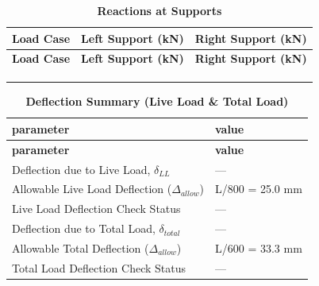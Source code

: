 \documentclass[12pt,a4paper]{report}
\numberwithin{table}{chapter}
\numberwithin{figure}{chapter}
\begin{document}
\vspace{1em}
\begin{longtable}{|>{\centering\arraybackslash}p{5.2cm}|>{\centering\arraybackslash}p{5.2cm}|>{\centering\arraybackslash}p{5.2cm}|}
\caption{\textbf{Reactions at Supports}}
\hline
\textbf{Load Case} & \textbf{Left Support (kN)} & \textbf{Right Support (kN)} \\[6pt]
\hline
\endfirsthead

\hline
\textbf{Load Case} & \textbf{Left Support (kN)} & \textbf{Right Support (kN)} \\[6pt]
\hline
\endhead
 &  &  \\[6pt]
\hline
 &  &  \\[6pt]
\hline
 &  &  \\[6pt]
\hline
\end{longtable}

\vspace{1em}
\begin{longtable}{|L{7cm}|p{8.5cm}|}
\caption{\textbf{Deflection Summary (Live Load \& Total Load)}}
\hline
\textbf{parameter} & \textbf{value} \\
\hline
\endfirsthead

\hline
\textbf{parameter} & \textbf{value} \\
\hline
\endhead
\textnormal{Deflection due to Live Load, $\delta_{LL}$} & --- \\[6pt]
\hline
\textnormal{Allowable Live Load Deflection ($\Delta_{allow}$)} & L/800 = 25.0 mm \\[6pt]
\hline
\textnormal{Live Load Deflection Check Status} & --- \\[6pt]
\hline
\textnormal{Deflection due to Total Load, $\delta_{total}$} & --- \\[6pt]
\hline
\textnormal{Allowable Total Deflection ($\Delta_{allow}$)} & L/600 = 33.3 mm \\[6pt]
\hline
\textnormal{Total Load Deflection Check Status} & --- \\[6pt]
\hline
\end{longtable}

\vspace{1em}
\noindent
\noindent{}
\noindent{}
\noindent{}
\end{document}
